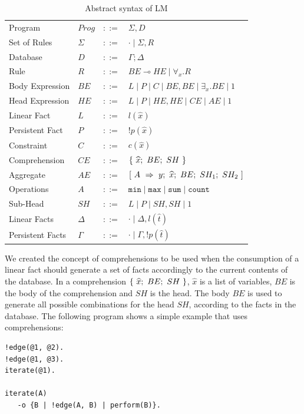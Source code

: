 \documentclass{sigplanconf}
\newcommand{\lolli}{\multimap}
\newcommand{\bang}{{!}}
\begin{document}
\begin{table}[ht]
\centering
{\scriptsize
\begin{tabular}{llcl}
Program          & $Prog$ & $::=$ & $\Sigma, D$ \\
Set of Rules     & $\Sigma$ & $::=$ & $\cdot \; | \; \Sigma, R$\\
Database         & $D$ & $::=$ & $\Gamma; \Delta$ \\
Rule             & $R$ & $::=$ & $BE \lolli HE \; | \; \forall_{x}. R$ \\
Body Expression  & $BE$ & $::=$ & $L \; | \; P \; | \; C \; | \; BE, BE \; | \; \exists_{x}. BE \; | \; 1$\\
Head Expression  & $HE$ & $::=$ & $L \; | \; P \; | \; HE, HE \; | \; CE \; | \; AE \; | \; 1$\\
Linear Fact      & $L$ & $::=$ & $l(\hat{x})$\\
Persistent Fact  & $P$ & $::=$ & $\bang p(\hat{x})$\\
Constraint       & $C$ & $::=$ & $c(\hat{x})$ \\
Comprehension    & $CE$ & $::=$ & $\{~\widehat{x};~BE;~SH~\}$ \\
Aggregate        & $AE$ & $::=$ & $[~A~\Rightarrow~y;~\widehat{x};~BE;~SH_1;~SH_2~]$ \\
Operations       & $A$ & $::=$ & $\mathtt{min} \; | \; \mathtt{max} \; | \; \mathtt{sum} \; | \; \mathtt{count}$ \\
Sub-Head         & $SH$ & $::=$ & $L \; | \; P \; | \; SH, SH \; | \; 1$\\
Linear Facts     & $\Delta$ & $::=$ & $\cdot \; | \; \Delta, l(\hat{t})$ \\
Persistent Facts & $\Gamma$ & $::=$ & $\cdot \; | \; \Gamma, \bang p(\hat{t})$ \\
\end{tabular}
}
\caption{Abstract syntax of LM}
\label{tbl:ast}
\end{table}

We created the concept of comprehensions to be used when the
consumption of a linear fact should generate a set of facts
accordingly to the current contents of the database. In a
comprehension $\{~\widehat{x};~BE;~SH~\}$, $\widehat{x}$ is a list of variables,
$BE$ is the body of the comprehension and $SH$ is the head. The body
$BE$ is used to generate all possible combinations for the head $SH$,
according to the facts in the database. The following program shows a
simple example that uses comprehensions:

{\footnotesize
\begin{Verbatim}
!edge(@1, @2).
!edge(@1, @3).
iterate(@1).

iterate(A)
   -o {B | !edge(A, B) | perform(B)}.
\end{Verbatim}
}
\end{document}
